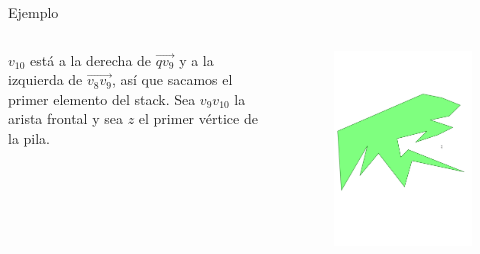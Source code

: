 \documentclass[aspectratio=169,xcolor=dvipsnames, t]{beamer}
\begin{document}
\begin{frame}{Ejemplo}
  \begin{columns}
    \begin{column}{0.3\textwidth}
      \raggedright %
      $v_{10}$ está a la derecha de $\overrightarrow{qv_{9}}$ y a la izquierda de $\overrightarrow{v_{8}v_{9}}$, así que sacamos el primer elemento del stack. Sea $v_9v_{10}$ la arista frontal y sea $z$ el primer vértice de la pila.
    \end{column}
    \begin{column}{0.7\textwidth}
      \vspace{-2.5cm} %
      \begin{figure}
        \centering
        \includegraphics[width=1\linewidth, height=.95\textheight, page=21, keepaspectratio]{IPE/point_visibility.pdf}
      \end{figure}
    \end{column}
  \end{columns}
\end{frame}
\end{document}

